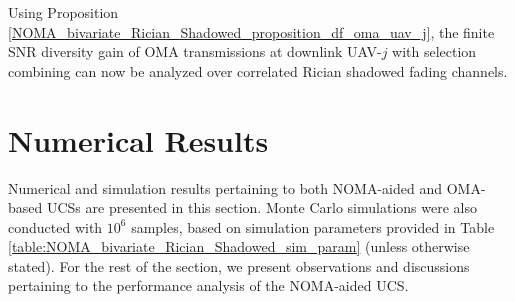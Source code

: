 Using Proposition \ref{NOMA_bivariate_Rician_Shadowed_proposition_df_oma_uav_j}, the finite SNR diversity gain of OMA transmissions at downlink UAV-$j$ with selection combining can now be analyzed over correlated Rician shadowed fading channels.


\section{Numerical Results} \label{NOMA_bivariate_Rician_Shadowed_sec_num_res}

Numerical and simulation results pertaining to both NOMA-aided and OMA-based UCSs are presented in this section. Monte Carlo simulations were also conducted with $10^{6}$ samples, based on simulation parameters provided in Table \ref{table:NOMA_bivariate_Rician_Shadowed_sim_param} (unless otherwise stated). For the rest of the section, we present observations and discussions pertaining to the performance analysis of the NOMA-aided UCS.

